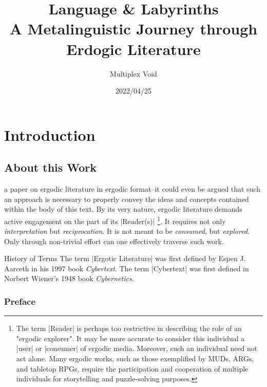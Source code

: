 \documentclass[10pt,twoside,twocolumn,openany,nomultitoc]{book}
\title{Language \& Labyrinths{} \\
\large A Metalinguistic Journey through Erdogic Literature}
\author{Multiplex Void}
\date{2022/04/25}
\begin{document}
\frontmatter
\maketitle
\tableofcontents
\mainmatter

\part{Introduction}   %
\chapter{About this Work}
 a paper on ergodic literature in ergodic format--it could even be argued 
that such an approach is necessary to properly convey the ideas and concepts contained within the body of this text. 
By its very nature, ergodic literature demands active engagement on the part of its 
|Reader(s)|
    \footnote{The term |Reader| is perhaps too restrictive in describing the role of an "ergodic explorer". 
        It may be more accurate to consider this individual a |user| or |consumer| of ergodic media. 
        Moreover, such  an individual need not act alone. 
        Many ergodic works, such as those exemplified by MUDs, ARGs, and tabletop RPGs, require the participation and cooperation of 
        multiple individuals for storytelling and puzzle-solving purposes.}. 
It requires not only \textit{interpretation} but \textit{reciprocation}. 
It is not meant to be \textit{consumed}, but \textit{explored}. Only through non-trivial effort can one effectively traverse 
such work. \\ 

\begin{DndSidebar}[]{History of Terms}
  The term |Ergotic Literature| was first defined by Espen J. Aarceth in his 1997 book \textit{Cybertext}.
  The term |Cybertext| was first defined in Norbert Wiener's 1948 book \textit{Cybernetics}.
\end{DndSidebar}

\section{Preface}
    \lipsum[1]
    
\end{document}
